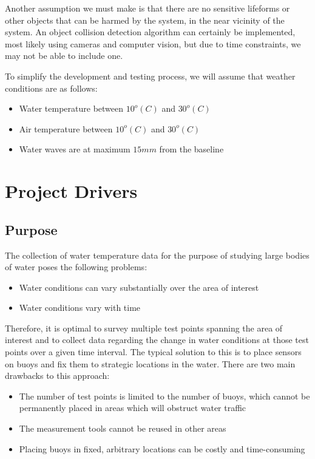 \documentclass[11pt]{article}
\begin{document}
Another assumption we must make is that there are no sensitive lifeforms or other objects that can be harmed by the system, in the near vicinity of the system. An object collision detection algorithm can certainly be implemented, most likely using cameras and computer vision, but due to time constraints, we may not be able to include one.

To simplify the development and testing process, we will assume that weather conditions are as follows:

\begin{itemize}
    \item Water temperature between $10^o (C)$ and $30^o (C)$
    \item Air temperature between $10^o (C)$ and $30^o (C)$
    \item Water waves are at maximum \pm $ 15mm$ from the baseline
\end{itemize}

\section{Project Drivers}
\subsection{Purpose}
The collection of water temperature data for the purpose of studying large bodies of water poses the following problems: 
\begin{itemize}
    \item Water conditions can vary substantially over the area of interest
    \item Water conditions vary with time
\end{itemize}

Therefore, it is optimal to survey multiple test points spanning the area of interest and to collect data regarding the change in water conditions at those test points over a given time interval. The typical solution to this is to place sensors on buoys and fix them to strategic locations in the water. There are two main drawbacks to this approach:
\begin{itemize}
    \item The number of test points is limited to the number of buoys, which cannot be permanently placed in areas which will obstruct water traffic
    \item The measurement tools cannot be reused in other areas
    \item Placing buoys in fixed, arbitrary locations can be costly and time-consuming
\end{itemize}
\end{document}
